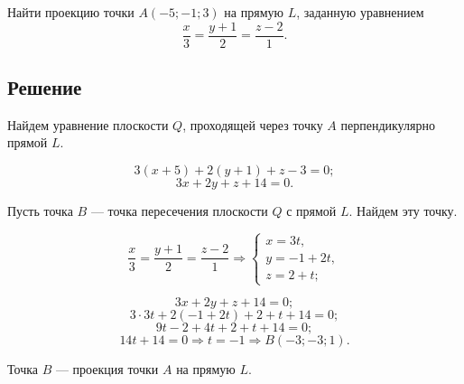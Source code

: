 \documentclass[12pt,a4paper]{article}
\begin{document}
Найти проекцию точки $A(-5;-1;3)$ на прямую $L$, заданную уравнением
$$
\frac{x}{3}=\frac{y+1}{2}=\frac{z-2}{1}.
$$

\subsection*{\textbf{Решение}}

Найдем уравнение плоскости $Q$, проходящей через точку $A$ перпендикулярно
прямой $L$.

$$
3(x+5)+2(y+1)+z-3=0;
$$
$$
3x+2y+z+14=0.
$$

Пусть точка $B$ --- точка пересечения плоскости $Q$ с прямой $L$. Найдем эту
точку.

$$
\frac{x}{3}=\frac{y+1}{2}=\frac{z-2}{1}
\Rightarrow
\begin{cases}
x=3t,\\
y=-1+2t,\\
z=2+t;
\end{cases}
$$

$$
3x+2y+z+14=0;
$$
$$
3\cdot3t+2(-1+2t)+2+t+14=0;
$$
$$
9t-2+4t+2+t+14=0;
$$
$$
14t+14=0\Rightarrow t=-1\Rightarrow B(-3;-3;1).
$$

Точка $B$ --- проекция точки $A$ на прямую $L$.
\end{document}
